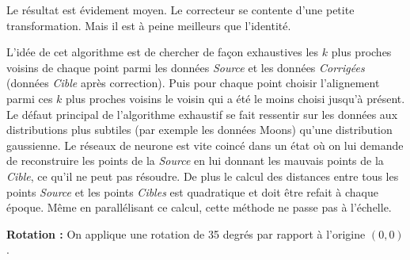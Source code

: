 Le résultat est évidement moyen. Le correcteur se contente d'une petite transformation. 
Mais il est à peine meilleurs que l'identité.

L'idée de cet algorithme est de chercher de façon exhaustives les $k$ plus proches voisins de chaque point
parmi les données \emph{Source} et les données \emph{Corrigées} (données \emph{Cible} après correction).
Puis pour chaque point choisir l'alignement parmi ces $k$ plus proches voisins le voisin qui a été le moins choisi jusqu'à présent.
Le défaut principal de l'algorithme exhaustif se fait ressentir sur les données aux distributions plus subtiles
(par exemple les données Moons) qu'une distribution gaussienne. Le réseaux de neurone est vite coincé dans 
un état où on lui demande de reconstruire les points de la \emph{Source} en lui donnant les mauvais points
de la \emph{Cible}, ce qu'il ne peut pas résoudre.
De plus le calcul des distances entre tous les points \textit{Source} et les points \textit{Cibles} est quadratique
et doit être refait à chaque époque. Même en parallélisant ce calcul, cette méthode ne passe pas à l'échelle.

{\Large \textbf{Rotation :}} On applique une rotation de 35 degrés par rapport à l'origine $(0,0)$.

